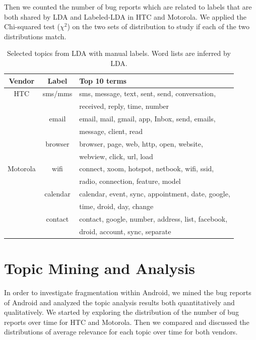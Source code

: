 \documentclass[10pt, conference, compsocconf]{IEEEtran}
\begin{document}
Then we counted the number of bug reports which are related to labels
that are both shared by LDA and Labeled-LDA in HTC and Motorola. 
We applied the Chi-squared test ($\chi^2$) on the two sets of distribution to
study if each of the two distributions match.

\begin{table}[!t]
\renewcommand{\arraystretch}{1.3}
\caption{Selected topics from LDA with manual labels. Word lists are inferred by LDA.}
\label{seleted2}
\centering
\begin{tabular}{|c||c||l|}
\hline
Vendor & Label & Top 10 terms\\
\hline
HTC & sms\//mms &sms, message, text, sent, send, conversation, \\
            && received, reply, time, number \\ \cline{2-3}
  & email & email, mail, gmail, app, Inbox, send, emails, \\
            &&message, client, read \\ \cline{2-3}
  & browser&browser, page, web, http, open, website, \\
            &&webview, click, url, load\\
\hline
Motorola & wifi &connect, xoom, hotspot, netbook, wifi, ssid, \\
           &&radio, connection, feature, model\\ \cline{2-3}
    &calendar& calendar, event, sync, appointment, date, google, \\
           &&time, droid, day, change \\ \cline{2-3}
    &contact & contact, google, number, address, list, facebook, \\
           &&droid, account, sync, separate \\
\hline
\end{tabular}
\end{table}


\section{Topic Mining and Analysis}
\label{sec:topicanalysis}

In order to investigate fragmentation within Android, we mined the bug
reports of Android and analyzed the topic analysis results both
quantitatively and qualitatively.
We started by exploring the distribution of the number of bug reports
over time for HTC and Motorola. Then we compared and discussed the
distributions of average relevance for each topic over time for both
vendors.
\end{document}
